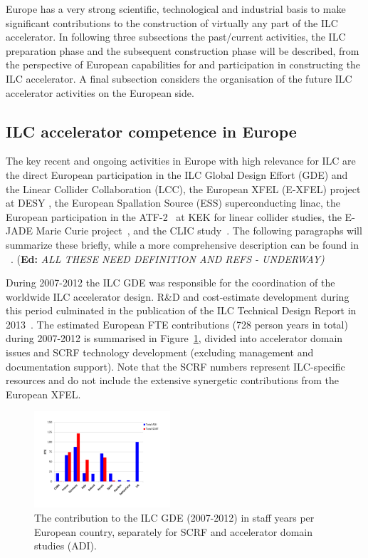 \documentclass[%
 reprint,
 floatfix,
 amsmath,amssymb,
 aps,
]{revtex4-1}
\newif\ifEdNotes \EdNotestrue
\newcommand{\doednote}[1]{{\color{red}(\textbf{Ed:} \textit{#1)}}}
\newcommand{\ednote}[1]{\ifEdNotes 
  \doednote{#1} 
\fi}
\begin{document}
Europe has a very strong scientific, technological and industrial basis to make significant contributions to the construction of virtually 
any part of the ILC accelerator. In following three subsections the past/current activities, the ILC preparation phase and the subsequent construction phase 
will be described, from the perspective of European capabilities for and participation in constructing the ILC accelerator. 
A final subsection considers the organisation of the future ILC accelerator activities on the European side. 

\subsection{ILC accelerator competence in Europe~\label{sec:acc:competence}}

The key recent and ongoing activities in Europe with high relevance for ILC are the direct
European participation in the ILC Global Design Effort (GDE) and the Linear Collider Collaboration (LCC),
the European XFEL (E-XFEL) project at DESY , the European Spallation Source (ESS) superconducting linac, the European 
participation in the ATF-2~\cite{Grishanov:2005ek,Grishanov:2006kx} at KEK for linear collider studies, the E-JADE Marie 
Curie project~\cite{ejade}, and the CLIC study~\cite{Aicheler:2012bya,Linssen:2012hp}. The following paragraphs 
will summarize these briefly, while a more comprehensive description can be found in ~\cite{ejade-report}. \ednote{ALL THESE NEED DEFINITION AND REFS - UNDERWAY}

During 2007-2012 the ILC GDE was responsible for the coordination of the worldwide ILC accelerator design. 
R\&D and cost-estimate development during this period culminated in the publication of the ILC Technical Design Report in 2013~\cite{Behnke:2013xla}. 
The estimated European FTE contributions (728 person years in total) during 2007-2012 is summarised in Figure~\ref{fig:PrePrep:ilcgde4}, 
divided into accelerator domain issues and SCRF technology development (excluding management and documentation support). 
Note that the SCRF numbers represent ILC-specific resources and do not include the extensive synergetic contributions from the European XFEL.

\begin{figure}[htbp]
\includegraphics[width=0.45\textwidth]{figures/EU-GDE-FTE-columns-per-country.pdf}
\caption{\label{fig:PrePrep:ilcgde4} The contribution to the ILC GDE (2007-2012) in staff years per European country, separately for SCRF and accelerator domain studies (ADI).}
\end{figure}
\end{document}
